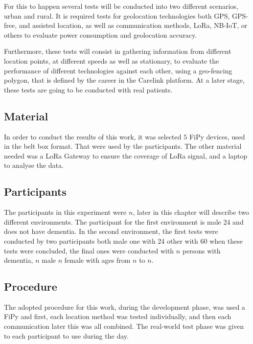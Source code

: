 For this to happen several tests will be conducted into two different scenarios, urban and rural. It is required tests for geolocation technologies both GPS, GPS-free, and assisted location, as well as communication methods, LoRa, NB-IoT, or others to evaluate power consumption and geolocation accuracy.

Furthermore, these tests will consist in gathering information from different location points, at different speeds as well as stationary, to evaluate the performance of different technologies against each other, using a geo-fencing polygon, that is defined by the career in the Carelink platform. At a later stage, these tests are going to be conducted with real patients.



\subsection{Material}
\label{subsec:material}
In order to conduct the results of this work, it was selected $5$  FiPy devices, used in the belt  box format. That were used by the participants. 
The other material needed was a LoRa Gateway to ensure the coverage of LoRa signal, and a laptop to analyse the data.



\subsection{Participants}
\label{subsec:Participants}
The participants in this experiment were $n$, later in this chapter will describe two different environments. The participant for the first environment is male 24 and does not have dementia. In the second environment, the first tests were conducted by two participants both male one with 24 other with 60 when these tests were concluded, the final ones were conducted with $n$ persons with dementia, $n$ male $n$ female with ages from $n$ to $n$.

\subsection{Procedure}
\label{subsec:Procedure}
The adopted procedure for this work, during the development phase, was used a FiPy and first, each location method was tested individually, and then each communication later this was all combined. The real-world test phase was given to each participant to use during the day.

